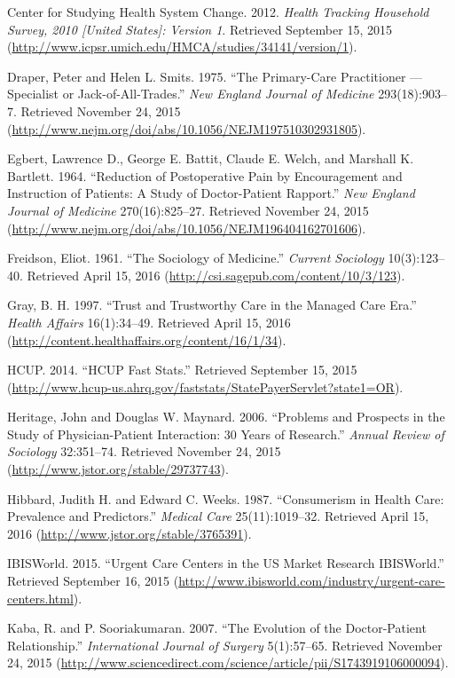 \documentclass[12pt,twoside]{reedthesis}
\begin{document}
  Center for Studying Health System Change. 2012. \emph{Health Tracking
  Household Survey, 2010 {[}United States{]}: Version 1}. Retrieved
  September 15, 2015
  (\url{http://www.icpsr.umich.edu/HMCA/studies/34141/version/1}).
  
  Draper, Peter and Helen L. Smits. 1975. ``The Primary-Care Practitioner
  --- Specialist or Jack-of-All-Trades.'' \emph{New England Journal of
  Medicine} 293(18):903--7. Retrieved November 24, 2015
  (\url{http://www.nejm.org/doi/abs/10.1056/NEJM197510302931805}).
  
  Egbert, Lawrence D., George E. Battit, Claude E. Welch, and Marshall K.
  Bartlett. 1964. ``Reduction of Postoperative Pain by Encouragement and
  Instruction of Patients: A Study of Doctor-Patient Rapport.'' \emph{New
  England Journal of Medicine} 270(16):825--27. Retrieved November 24,
  2015 (\url{http://www.nejm.org/doi/abs/10.1056/NEJM196404162701606}).
  
  Freidson, Eliot. 1961. ``The Sociology of Medicine.'' \emph{Current
  Sociology} 10(3):123--40. Retrieved April 15, 2016
  (\url{http://csi.sagepub.com/content/10/3/123}).
  
  Gray, B. H. 1997. ``Trust and Trustworthy Care in the Managed Care
  Era.'' \emph{Health Affairs} 16(1):34--49. Retrieved April 15, 2016
  (\url{http://content.healthaffairs.org/content/16/1/34}).
  
  HCUP. 2014. ``HCUP Fast Stats.'' Retrieved September 15, 2015
  (\url{http://www.hcup-us.ahrq.gov/faststats/StatePayerServlet?state1=OR}).
  
  Heritage, John and Douglas W. Maynard. 2006. ``Problems and Prospects in
  the Study of Physician-Patient Interaction: 30 Years of Research.''
  \emph{Annual Review of Sociology} 32:351--74. Retrieved November 24,
  2015 (\url{http://www.jstor.org/stable/29737743}).
  
  Hibbard, Judith H. and Edward C. Weeks. 1987. ``Consumerism in Health
  Care: Prevalence and Predictors.'' \emph{Medical Care} 25(11):1019--32.
  Retrieved April 15, 2016 (\url{http://www.jstor.org/stable/3765391}).
  
  IBISWorld. 2015. ``Urgent Care Centers in the US Market Research
  IBISWorld.'' Retrieved September 16, 2015
  (\url{http://www.ibisworld.com/industry/urgent-care-centers.html}).
  
  Kaba, R. and P. Sooriakumaran. 2007. ``The Evolution of the
  Doctor-Patient Relationship.'' \emph{International Journal of Surgery}
  5(1):57--65. Retrieved November 24, 2015
  (\url{http://www.sciencedirect.com/science/article/pii/S1743919106000094}).
  
\end{document}
